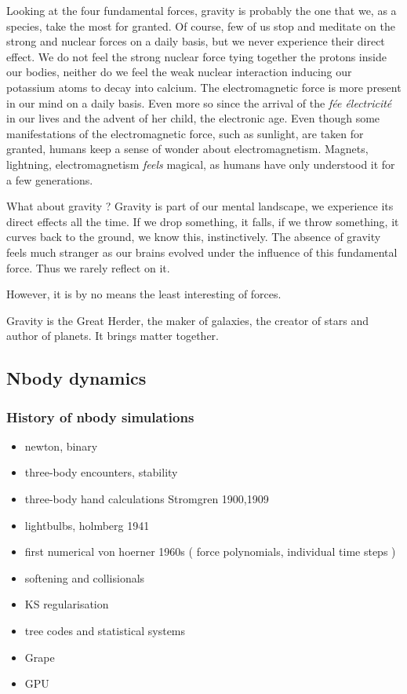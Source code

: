 






Looking at the four fundamental forces, gravity is probably the one that we, as a species, take the most for granted. Of course, few of us stop and meditate on the strong and nuclear forces on a daily basis, but we never experience their direct effect. We do not feel the strong nuclear force tying together the protons inside our bodies,  neither do we feel the weak nuclear interaction inducing our potassium atoms to decay into calcium. The electromagnetic force is more present in our mind on a daily basis. Even more so since the arrival of the \textit{f\'ee \'electricit\'e} in our lives and the advent of her child, the electronic age. Even though some manifestations of the electromagnetic force, such as sunlight, are taken for granted, humans keep a sense of wonder about electromagnetism. Magnets, lightning, electromagnetism \textit{feels} magical, as humans have only understood it for a few generations.

What about gravity ? Gravity is part of our mental landscape, we experience its direct effects all the time. If we drop something, it falls, if we throw something, it curves back to the ground, we know this, instinctively. The absence of gravity feels much stranger as our brains evolved under the influence of this fundamental force. Thus we rarely reflect on it. 

However, it is by no means the least interesting of forces.
 
Gravity is the Great Herder, the maker of galaxies, the creator of stars and author of planets. It brings matter together.  


\subsection*{Nbody dynamics}

\subsubsection{History of nbody simulations}

\begin{itemize}
\item newton, binary
\item three-body encounters, stability
\item three-body hand calculations Stromgren 1900,1909
\item lightbulbs, holmberg 1941
\item first numerical von hoerner 1960s ( force polynomials, individual time steps )
\item softening and collisionals
\item KS regularisation
\item tree codes and statistical systems
\item Grape
\item GPU
\end{itemize}

